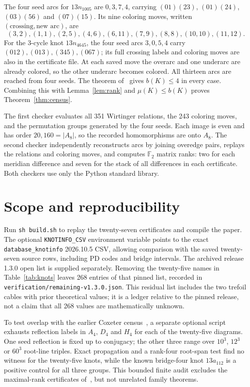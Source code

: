 \documentclass[11pt]{amsart}
\theoremstyle{remark}
\newcommand{\F}{\mathbb F}
\begin{document}
The four seed arcs for $13n_{1005}$ are $0,3,7,4$, carrying $(01)(23)$, $(01)(24)$, $(03)(56)$ and $(07)(15)$. Its nine coloring moves, written $(\text{crossing},\text{new arc})$, are
\[
  (3,2),(1,1),(2,5),(4,6),(6,11),(7,9),(8,8),(10,10),(11,12).
\]
For the $3$-cycle knot $13n_{4645}$, the four seed arcs $3,0,5,4$ carry $(012),(013),(345),(067)$; its full crossing labels and coloring moves are also in the certificate file. At each saved move the overarc and one underarc are already colored, so the other underarc becomes colored. All thirteen arcs are reached from four seeds. The theorem of~\cite{BKVV} gives $b(K)\le4$ in every case. Combining this with Lemma~\ref{lem:rank} and $\mu(K)\le b(K)$ proves Theorem~\ref{thm:census}.

\newpage
The first checker evaluates all 351 Wirtinger relations, the 243 coloring moves, and the permutation groups generated by the four seeds. Each image is even and has order $20{,}160=|A_8|$, so the recorded homomorphisms are onto $A_8$. The second checker independently reconstructs arcs by joining overedge pairs, replays the relations and coloring moves, and computes $\F_2$ matrix ranks: two for each meridian difference and seven for the stack of all differences in each certificate. Both checkers use only the Python standard library.

\section{Scope and reproducibility}

Run \texttt{sh build.sh} to replay the twenty-seven certificates and compile the paper. The optional \texttt{KNOTINFO\_CSV} environment variable points to the exact \texttt{database\_knotinfo} 2026.10.5 CSV, allowing comparison with the saved twenty-seven source rows, including PD codes and bridge intervals. The archived release 1.3.0 open list is supplied separately. Removing the twenty-five names in Table~\ref{tab:knots} leaves 268 entries of that pinned list, recorded in \texttt{verification/remaining-v1.3.0.json}. This residual list includes the two trefoil cables with prior theoretical values; it is a ledger relative to the pinned release, not a claim that all 268 values are mathematically unknown.

To test overlap with the earlier Coxeter census~\cite{BKM}, a separate optional script exhausts reflection labels in $A_4$, $D_4$ and $H_4$ for each of the twenty-five diagrams. One seed reflection is fixed up to conjugacy; the other three range over $10^3$, $12^3$ or $60^3$ root-line triples. Exact propagation and a rank-four root-span test find no witness for the twenty-five knots, while the known bridge-four knot $13a_{112}$ is a positive control for all three groups. This bounded finite audit excludes the maximal-rank certificates of~\cite{BKM}, but not unrelated family theorems.
\end{document}

